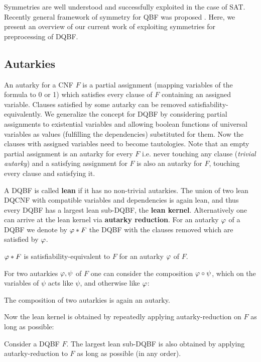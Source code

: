 \documentclass[conference]{IEEEtran}
\begin{document}
Symmetries are well understood and successfully exploited in the case of SAT. 
%
Recently general framework of symmetry for QBF was proposed \cite{kauers2018symmetries}.
%
Here, we present an overview of our current work of exploiting symmetries for preprocessing of DQBF.   

\subsection{Autarkies}
\label{sec:aut}
An autarky for a CNF $F$ is a partial assignment (mapping variables of the formula to 0 or 1) which satisfies every clause of $F$ containing an assigned variable. 
%
Clauses satisfied by some autarky can be removed satisfiability-equivalently. 
%
We generalize the concept for DQBF by considering partial assignments to existential variables and allowing boolean functions of universal variables as values (fulfilling the dependencies) substituted for them.
%
Now the clauses with assigned variables need to become tautologies.
%
Note that an empty partial assignment is an autarky for every $F$ i.e. never touching any clause (\textit{trivial autarky}) and a satisfying assignment for $F$ is also an autarky for $F$, touching every clause and satisfying it.

A DQBF is called \textbf{lean} if it has no non-trivial autarkies.
The union of two lean DQCNF with compatible variables and dependencies is again lean, and thus every DQBF has a largest lean sub-DQBF, the \textbf{lean kernel}.
Alternatively one can arrive at the lean kernel via \textbf{autarky reduction}.
For an autarky $\varphi$ of a DQBF we denote by $\varphi * F$ the DQBF with the clauses removed which are satisfied by $\varphi$.
\begin{lem}\label{lem:autsateq}
	$\varphi * F$ is satisfiability-equivalent to $F$ for an autarky $\varphi$ of $F$.
\end{lem}
For two autarkies $\varphi, \psi$ of $F$ one can consider the composition $\varphi \circ \psi$, which on the variables of $\psi$ acts like $\psi$, and otherwise like $\varphi$:
\begin{lem}\label{lem:compaut}
	The composition of two autarkies is again an autarky.
\end{lem}
Now the lean kernel is obtained by repeatedly applying autarky-reduction on $F$ as long as possible:
\begin{lem}\label{lem:decomp}
	Consider a DQBF $F$. The largest lean sub-DQBF is also obtained by applying autarky-reduction to $F$ as long as possible (in any order).
\end{lem}
\end{document}
